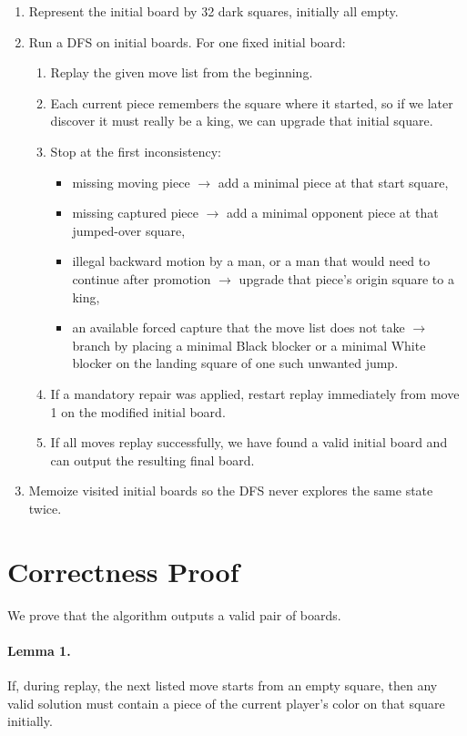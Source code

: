 \documentclass[11pt]{article}
\begin{document}
\begin{enumerate}[leftmargin=*]
    \item Represent the initial board by 32 dark squares, initially all empty.
    \item Run a DFS on initial boards. For one fixed initial board:
    \begin{enumerate}[leftmargin=*]
        \item Replay the given move list from the beginning.
        \item Each current piece remembers the square where it started, so if we later discover it must really be a king, we can upgrade that initial square.
        \item Stop at the first inconsistency:
        \begin{itemize}[leftmargin=*]
            \item missing moving piece $\rightarrow$ add a minimal piece at that start square,
            \item missing captured piece $\rightarrow$ add a minimal opponent piece at that jumped-over square,
            \item illegal backward motion by a man, or a man that would need to continue after promotion $\rightarrow$ upgrade that piece's origin square to a king,
            \item an available forced capture that the move list does not take $\rightarrow$ branch by placing a minimal Black blocker or a minimal White blocker on the landing square of one such unwanted jump.
        \end{itemize}
        \item If a mandatory repair was applied, restart replay immediately from move 1 on the modified initial board.
        \item If all moves replay successfully, we have found a valid initial board and can output the resulting final board.
    \end{enumerate}
    \item Memoize visited initial boards so the DFS never explores the same state twice.
\end{enumerate}

\section*{Correctness Proof}

We prove that the algorithm outputs a valid pair of boards.

\paragraph{Lemma 1.}
If, during replay, the next listed move starts from an empty square, then any valid solution must contain a piece of the current player's color on that square initially.
\end{document}
